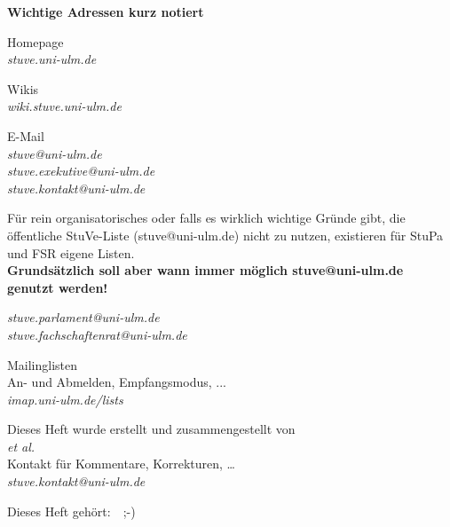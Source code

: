 %
%


\newpage
\thispagestyle{empty}

\bigskip

\begin{center}

\null
\vspace{2em}
\textbf{Wichtige Adressen kurz notiert}

\bigskip
Homepage\\
\textit{stuve.uni-ulm.de}

\bigskip
Wikis\\
\textit{wiki.stuve.uni-ulm.de}

\bigskip
E-Mail\\
\textit{stuve@uni-ulm.de\\
stuve.exekutive@uni-ulm.de\\
stuve.kontakt@uni-ulm.de}\\

\null
\begin{minipage}{0.5\textwidth}
	\scriptsize
	\begin{center}
	Für rein organisatorisches oder falls es wirklich wichtige Gründe gibt, die öffentliche StuVe-Liste (stuve@uni-ulm.de) nicht zu nutzen, existieren für StuPa und FSR eigene Listen. \\\textbf{Grundsätzlich soll aber wann immer möglich stuve@uni-ulm.de genutzt werden!}
	\end{center}
\end{minipage}

\null
\textit{stuve.parlament@uni-ulm.de\\
stuve.fachschaftenrat@uni-ulm.de}

\bigskip
Mailinglisten\\
{\scriptsize An- und Abmelden, Empfangsmodus, ...}\\
\textit{imap.uni-ulm.de/lists}

\null
\vfill
Dieses Heft wurde erstellt und zusammengestellt von\\
\textit{et al.}\\
\null
Kontakt für Kommentare, Korrekturen, …\\
\textit{stuve.kontakt@uni-ulm.de}
\null
\vfill
\begin{minipage}{0.8\textwidth}
Dieses Heft gehört:~\hrulefill~;-)
\end{minipage}
\vspace{2em}
\null

\end{center}

\clearpage
